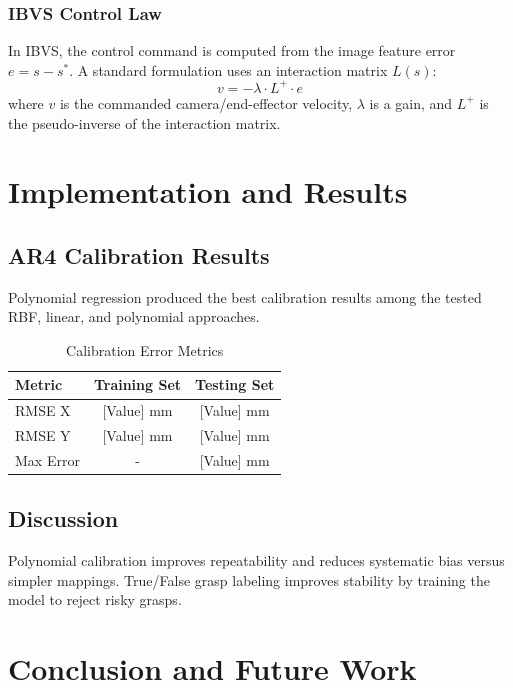 \documentclass[15pt, a4paper]{extreport}
\begin{document}
\subsection{IBVS Control Law}
In IBVS, the control command is computed from the image feature error $e=s-s^{*}$. A standard formulation uses an interaction matrix $L(s)$:
\begin{equation}
    v = -\lambda \cdot L^{+} \cdot e
\end{equation}
where $v$ is the commanded camera/end-effector velocity, $\lambda$ is a gain, and $L^{+}$ is the pseudo-inverse of the interaction matrix.

\chapter{Implementation and Results}

\section{AR4 Calibration Results}
Polynomial regression produced the best calibration results among the tested RBF, linear, and polynomial approaches.

\begin{table}[h]
    \centering
    \caption{Calibration Error Metrics}
    \begin{tabular}{l c c}
        \toprule
        \textbf{Metric} & \textbf{Training Set} & \textbf{Testing Set} \\
        \midrule
        RMSE X & [Value] mm & [Value] mm \\
        RMSE Y & [Value] mm & [Value] mm \\
        Max Error & - & [Value] mm \\
        \bottomrule
    \end{tabular}
    \label{tab:calibration}
\end{table}

\section{Discussion}
Polynomial calibration improves repeatability and reduces systematic bias versus simpler mappings. True/False grasp labeling improves stability by training the model to reject risky grasps.

\chapter{Conclusion and Future Work}
\end{document}
